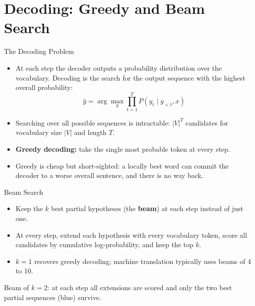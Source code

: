 \section{Decoding: Greedy and Beam Search}

\begin{frame}{The Decoding Problem}
  \begin{itemize}
    \item At each step the decoder outputs a probability distribution over the vocabulary. Decoding is the search for the output sequence with the highest overall probability:
    \[
      \hat{y} = \arg\max_{y} \prod_{t=1}^{T} P(y_t \mid y_{<t}, x)
    \]
    \item Searching over all possible sequences is intractable: $|V|^T$ candidates for vocabulary size $|V|$ and length $T$.
    \item \textbf{Greedy decoding:} take the single most probable token at every step.
    \item Greedy is cheap but short-sighted: a locally best word can commit the decoder to a worse overall sentence, and there is no way back.
  \end{itemize}
\end{frame}

\begin{frame}{Beam Search}
  \begin{itemize}
    \item Keep the $k$ best partial hypotheses (the \textbf{beam}) at each step instead of just one.
    \item At every step, extend each hypothesis with every vocabulary token, score all candidates by cumulative log-probability, and keep the top $k$.
    \item $k=1$ recovers greedy decoding; machine translation typically uses beams of 4 to 10.
  \end{itemize}

  \vspace{0.4em}
  \centering

  {\scriptsize Beam of $k=2$: at each step all extensions are scored and only the two best partial sequences (blue) survive.}
\end{frame}

